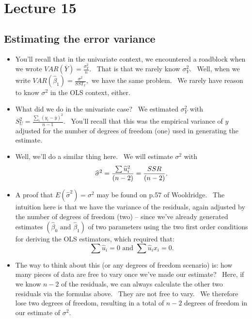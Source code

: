 \documentclass[11pt]{article}
\begin{document}
\section{Lecture 15}

\subsection{Estimating the error variance}

\begin{itemize}
\item You'll recall that in the univariate context, we encountered a
roadblock when we wrote $VAR(\overline{Y})=\frac{\sigma _{Y}^{2}}{n}.$ \
That is that we rarely know $\sigma _{Y}^{2}.$ \ Well, when we write $%
VAR\left( \widehat{\beta }_{1}\right) =\frac{\sigma ^{2}}{SST_{x}},$ we have
the same problem. \ We rarely have reason to know $\sigma ^{2}$ in the OLS
context, either. \ 

\item What did we do in the univariate case? \ We estimated $\sigma _{Y}^{2}$
with $S_{U}^{2}=\frac{\sum\nolimits_{i}\left( y_{i}-\overline{y}\right) ^{2}%
}{n-1}.$ \ You'll recall that this was the empirical variance of $y$
adjusted for the number of degrees of freedom (one) used in generating the
estimate.

\item Well, we'll do a similar thing here. \ We will estimate $\sigma ^{2}$
with 
\begin{equation*}
\widehat{\sigma }^{2}=\frac{\sum \widehat{u}_{i}^{2}}{(n-2)}=\frac{SSR}{%
\left( n-2\right) }.
\end{equation*}

\item A proof that $E(\widehat{\sigma }^{2})=\sigma ^{2}$ may be found on
p.57 of Wooldridge. \ The intuition here is that we have the variance of the
residuals, again adjusted by the number of degrees of freedom (two) -- since
we've already generated estimates $\left( \widehat{\beta }_{0}\text{ and }%
\widehat{\beta }_{1}\right) $ of two parameters using the two first order
conditions for deriving the OLS estimators, which required that:%
\begin{equation*}
\sum \widehat{u}_{i}=0\text{ \ and \ }\sum \widehat{u}_{i}x_{i}=0.
\end{equation*}

\item The way to think about this (or any degrees of freedom scenario) is:
how many pieces of data are free to vary once we've made our estimate? \
Here, if we know $n-2$ of the residuals, we can always calculate the other
two residuals via the formulas above. \ They are not free to vary. \ We
therefore lose two degrees of freedom, resulting in a total of $n-2$ degrees
of freedom in our estimate of $\sigma ^{2}.$


\end{itemize}
\end{document}
